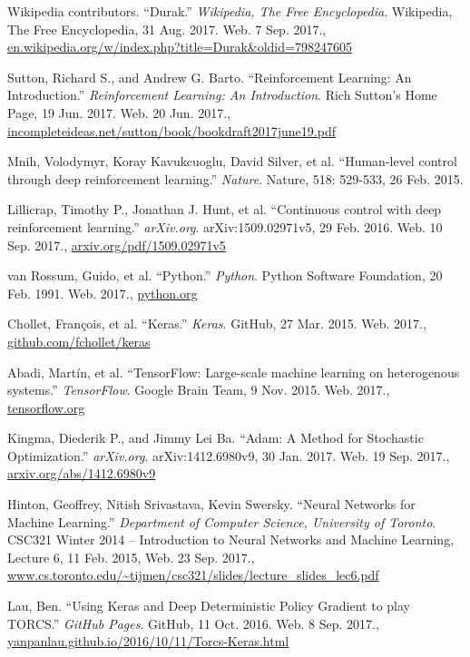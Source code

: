 \documentclass[a4paper,titlepage]{article}
\begin{document}
\begin{thebibliography}{99}

  Wikipedia contributors. ``Durak.'' \emph{Wikipedia, The Free Encyclopedia}. Wikipedia, The Free Encyclopedia, 31 Aug. 2017. Web.
  7 Sep. 2017., \\
  \url{en.wikipedia.org/w/index.php?title=Durak&oldid=798247605}

  Sutton, Richard S., and Andrew G. Barto. ``Reinforcement Learning: An Introduction.'' \emph{Reinforcement Learning: An Introduction}. Rich Sutton's Home Page, 19 Jun. 2017. Web.
  20 Jun. 2017.,
  \url{incompleteideas.net/sutton/book/bookdraft2017june19.pdf}

  Mnih, Volodymyr, Koray Kavukcuoglu, David Silver, et al. ``Human-level control through deep reinforcement learning.'' \emph{Nature}. Nature, 518: 529-533, 26 Feb. 2015.

  Lillicrap, Timothy P., Jonathan J. Hunt, et al. ``Continuous control with deep reinforcement learning.'' \emph{arXiv.org}. arXiv:1509.02971v5, 29 Feb. 2016. Web.
  10 Sep. 2017.,
  \url{arxiv.org/pdf/1509.02971v5}

  van Rossum, Guido, et al. ``Python.'' \emph{Python}. Python Software Foundation, 20 Feb. 1991. Web.
  2017.,
  \url{python.org}

  Chollet, Fran\c{c}ois, et al. ``Keras.'' \emph{Keras}. GitHub, 27 Mar. 2015. Web.
  2017.,
  \url{github.com/fchollet/keras}

  Abadi, Martín, et al. ``TensorFlow: Large-scale machine learning on heterogenous systems.'' \emph{TensorFlow}. Google Brain Team, 9 Nov. 2015. Web.
  2017.,
  \url{tensorflow.org}

  Kingma, Diederik P., and Jimmy Lei Ba. ``Adam: A Method for Stochastic Optimization.'' \emph{arXiv.org}. arXiv:1412.6980v9, 30 Jan. 2017. Web.
  19 Sep. 2017.,
  \url{arxiv.org/abs/1412.6980v9}

  Hinton, Geoffrey, Nitish Srivastava, Kevin Swersky. ``Neural Networks for Machine Learning.'' \emph{Department of Computer Science, University of Toronto}. CSC321 Winter 2014 -- Introduction to Neural Networks and Machine Learning, Lecture 6, 11 Feb. 2015, Web. 23 Sep. 2017.,
  \url{www.cs.toronto.edu/~tijmen/csc321/slides/lecture_slides_lec6.pdf}

  Lau, Ben. ``Using Keras and Deep Deterministic Policy Gradient to play TORCS.'' \emph{GitHub Pages}. GitHub, 11 Oct. 2016. Web.
  8 Sep. 2017.,
  \url{yanpanlau.github.io/2016/10/11/Torcs-Keras.html}

\end{thebibliography}
\end{document}
